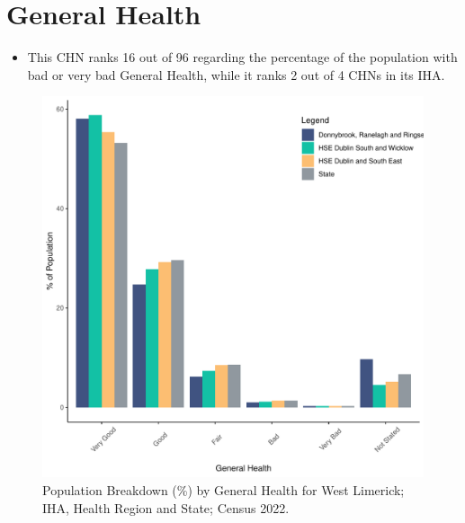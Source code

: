 \documentclass{article}
\begin{document}
\pagebreak

\section{General Health}\label{sect:GenHealth}
\begin{itemize}
\item  This CHN ranks  16 out of 96 regarding the percentage of the population with bad or very bad General Health, while it ranks   2 out of 4 CHNs in its IHA.
\end{itemize}
\begin{figure}[h]
	\centering
	\includegraphics[width = 150mm]{../figures/GenED.pdf}
	\caption{Population Breakdown (\%) by General Health for West Limerick; IHA, Health Region and State;  Census 2022.}
	\label{fig:2ae19629-1a6a-13a3-e055-000000000001}
	\end{figure}
\end{document}
